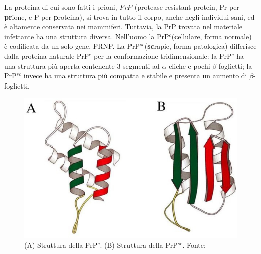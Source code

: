 {\par La proteina di cui sono fatti i prioni, \textit{PrP} (protease-resistant-protein, Pr per \textbf{pr}ione, e P per \textbf{p}roteina), si trova in tutto il corpo, anche negli individui sani, ed è altamente conservata nei mammiferi. Tuttavia, la PrP trovata nel materiale infettante ha una struttura diversa. Nell'uomo la PrP$^{c}$(\textbf{c}ellulare, forma normale) è codificata da un solo gene, PRNP. La PrP$^{sc}$(\textbf{sc}rapie, forma patologica) differisce dalla proteina naturale PrP$^{c}$ per la conformazione tridimensionale: la PrP$^{c}$ ha una struttura più aperta contenente 3 segmenti ad $\alpha$-eliche e pochi $\beta$-foglietti; la PrP$^{sc}$ invece ha una struttura più compatta e stabile e presenta un aumento di $\beta$-foglietti.

\begin{figure}[h]
	\centering
	\includegraphics{images/PrPc.jpg}
	\caption{(A) Struttura della PrP$^{c}$. (B) Struttura della PrP$^{sc}$. Fonte: \cite{ruttkay2015prion}}
	\label{fig:PrPc}
\end{figure} 

}
